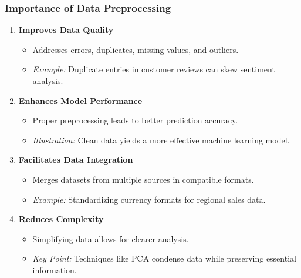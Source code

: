 \documentclass[aspectratio=169]{beamer}
\begin{document}
\begin{frame}[fragile]
    \frametitle{Importance of Data Preprocessing}
    \begin{enumerate}
        \item \textbf{Improves Data Quality}
        \begin{itemize}
            \item Addresses errors, duplicates, missing values, and outliers.
            \item \textit{Example:} Duplicate entries in customer reviews can skew sentiment analysis.
        \end{itemize}
        
        \item \textbf{Enhances Model Performance}
        \begin{itemize}
            \item Proper preprocessing leads to better prediction accuracy.
            \item \textit{Illustration:} Clean data yields a more effective machine learning model.
        \end{itemize}
        
        \item \textbf{Facilitates Data Integration}
        \begin{itemize}
            \item Merges datasets from multiple sources in compatible formats.
            \item \textit{Example:} Standardizing currency formats for regional sales data.
        \end{itemize}
        
        \item \textbf{Reduces Complexity}
        \begin{itemize}
            \item Simplifying data allows for clearer analysis.
            \item \textit{Key Point:} Techniques like PCA condense data while preserving essential information.
        \end{itemize}
    \end{enumerate}
\end{frame}
\end{document}
